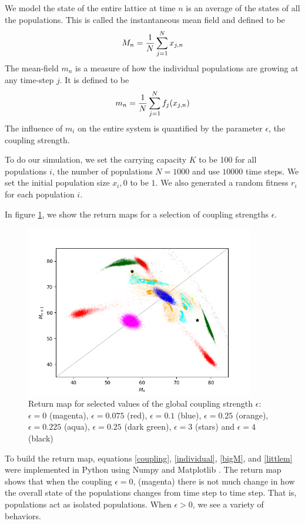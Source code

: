 \documentclass[conference]{IEEEtran}
\begin{document}
We model the state of the entire lattice at time $n$ is an average of the states of all the populations.  This is called the instantaneous mean field and defined to be
\begin{eqnarray}
M_n = { 1 \over N} \sum _{j=1}^N x_{j,n}
\label{bigM}
\end{eqnarray}
 The mean-field $m_n$ is a measure of how the individual populations are growing at any time-step $j$.  It is defined to be 
 \begin{eqnarray}
 m_n = {1 \over N} \sum_{j=1}^N f_j(x_{j,n})
 \label{littlem}
\end{eqnarray}
The influence of $m_i$ on the entire system is quantified by the parameter $\epsilon$, the coupling strength.  
 
To do our simulation,  we set the carrying capacity $K$ to be 100 for all populations $i$, the number of populations $N = 1000$ and use $10000$ time steps.   We set the initial population size $x_i, 0$ to be $1$.   We also generated a random fitness $r_i$ for each population $i$.   

In figure \ref{prettypicture}, we show the return maps for a selection of coupling strengths $\epsilon$.  

 \begin{figure}[t]
 \centering
    \includegraphics[width=100mm]{prettypicture}
    
    \caption{ Return map for selected values of  the global coupling strength $\epsilon$:  $\epsilon =0$ (magenta), $\epsilon = 0.075$ (red), $\epsilon = 0.1$ (blue), $\epsilon = 0.25$ (orange), $\epsilon = 0.225$ (aqua), $\epsilon = 0.25$ (dark green), $\epsilon = 3 $ (stars) and $\epsilon = 4$ (black)}
 \label{prettypicture}
\end{figure} 

To build the return map, equations \ref{coupling},  \ref{individual}, \ref{bigM},  and \ref{littlem} were implemented  in Python using Numpy \cite{numpy} and Matplotlib \cite{matplotlib}.   The return map shows that when the coupling $\epsilon = 0$,  (magenta) there is not much change in how the overall state of the populations changes from time step to time step.  That is, populations  act as isolated populations.   When $\epsilon > 0$, we see a variety of behaviors. 
\end{document}
